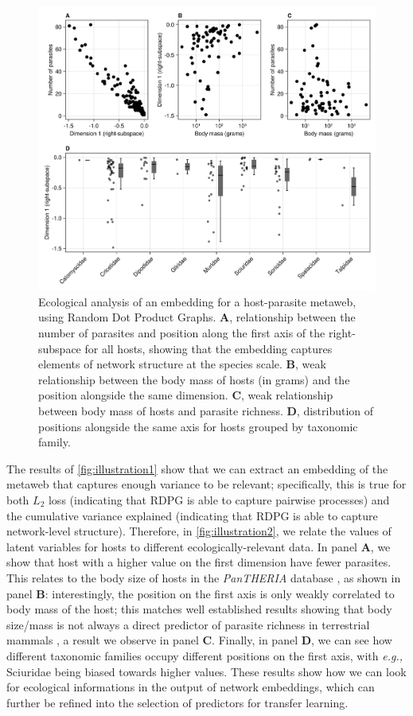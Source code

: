 \begin{figure}[h]
    \centering
    \includegraphics[width=\textwidth]{figures/illustration-part2.png}
    \caption{Ecological analysis of an embedding for a host-parasite
metaweb, using Random Dot Product Graphs. \textbf{A}, relationship
between the number of parasites and position along the first axis of the
right-subspace for all hosts, showing that the embedding captures
elements of network structure at the species scale. \textbf{B}, weak
relationship between the body mass of hosts (in grams) and the position
alongside the same dimension. \textbf{C}, weak relationship between body
mass of hosts and parasite richness. \textbf{D}, distribution of
positions alongside the same axis for hosts grouped by taxonomic
family.}
    \label{fig:illustration2}
\end{figure}

The results of \autoref{fig:illustration1} show that we can extract an embedding
of the metaweb that captures enough variance to be relevant;
specifically, this is true for both \(L_2\) loss (indicating that RDPG
is able to capture pairwise processes) and the cumulative variance
explained (indicating that RDPG is able to capture network-level
structure). Therefore, in \autoref{fig:illustration2}, we relate the values of
latent variables for hosts to different ecologically-relevant data. In
panel \textbf{A}, we show that host with a higher value on the first
dimension have fewer parasites. This relates to the body size of hosts
in the \emph{PanTHERIA} database \cite{Jones2009Pantheria}, as shown in
panel \textbf{B}: interestingly, the position on the first axis is only
weakly correlated to body mass of the host; this matches well
established results showing that body size/mass is not always a direct
predictor of parasite richness in terrestrial mammals
\cite{Morand1998Density}, a result we observe in panel \textbf{C}.
Finally, in panel \textbf{D}, we can see how different taxonomic
families occupy different positions on the first axis, with \emph{e.g.,}
Sciuridae being biased towards higher values. These results show how we
can look for ecological informations in the output of network
embeddings, which can further be refined into the selection of
predictors for transfer learning.

